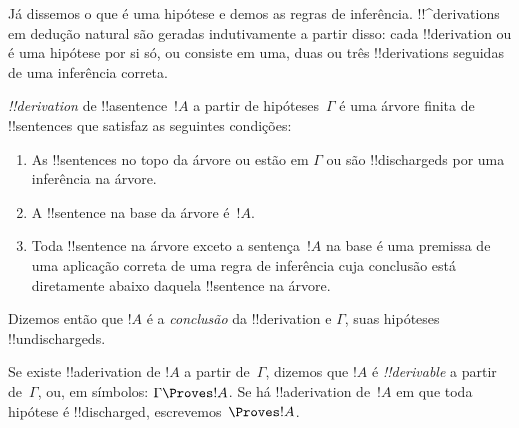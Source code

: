 \documentclass[../../../include/open-logic-section]{subfiles}
\begin{document}
      {}
      {}


\begin{explain}
Já dissemos o que é uma hipótese e demos as regras de
inferência.  !!^{derivation}s em dedução natural são geradas
indutivamente a partir disso: cada !!{derivation} ou é uma hipótese
por si só, ou consiste em uma, duas ou três !!{derivation}s seguidas
de uma inferência correta.
\end{explain}

\begin{defn}[!!^{derivation}]
 \emph{!!{derivation}} de !!a{sentence}~$!A$ a partir de
hipóteses~$\Gamma$ é uma árvore finita de !!{sentence}s que satisfaz as
seguintes condições:
\begin{enumerate}
\item As !!{sentence}s no topo da árvore ou estão em $\Gamma$ ou
  são !!{discharged}s por uma inferência na árvore.
\item A !!{sentence} na base da árvore é~$!A$.
\item Toda !!{sentence} na árvore exceto a sentença~$!A$ na
  base é uma premissa de uma aplicação correta de uma regra de inferência
  cuja conclusão está diretamente abaixo daquela !!{sentence} na
  árvore.
\end{enumerate}
Dizemos então que $!A$ é a \emph{conclusão} da !!{derivation}
e $\Gamma$, suas hipóteses !!{undischarged}s.

Se existe !!a{derivation} de $!A$ a partir de~$\Gamma$, dizemos que $!A$ é
\emph{!!{derivable}} a partir de~$\Gamma$, ou, em símbolos: $\Gamma \Proves
!A$. Se há !!a{derivation} de~$!A$ em que toda hipótese é
!!{discharged}, escrevemos~$\Proves !A$.
\end{defn}
\end{document}
